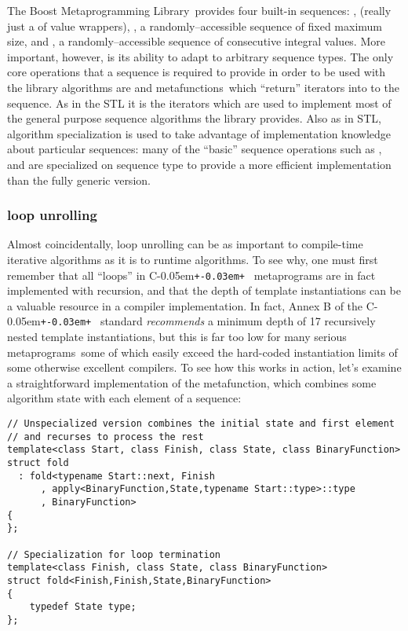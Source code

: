 \documentclass{kapproc}
\newcommand{\Cpp}{C\kern-0.05em\texttt{+\kern-0.03em+}%
}
\newcommand{\Mpl}{Boost Meta\-pro\-gram\-ming Library}
\newcommand{\mpgms}{meta\-pro\-grams}
\newcommand{\mfn}{meta\-func\-tion}
\newcommand{\mfns}{meta\-func\-tions}
\begin{document}
The \Mpl\ provides four built-in sequences: ,
 (really just a  of value
wrappers), , a randomly--accessible sequence of
fixed maximum size, and , a randomly--accessible
sequence of consecutive integral values. More important, however, is
its ability to adapt to arbitrary sequence types. The only core
operations that a sequence is required to provide in order to be used
with the library algorithms are  and  \mfns\
which ``return'' iterators into to the sequence. As in the STL it is
the iterators which are used to implement most of the general purpose
sequence algorithms the library provides. Also as in STL, algorithm
specialization is used to take advantage of implementation knowledge
about particular sequences: many of the ``basic'' sequence operations
such as \code{back<>}, \code{front<>} \code{size<>} and \code{at<>}
are specialized on sequence type to provide a more efficient
implementation than the fully generic version.


  \subsubsection{loop unrolling}

Almost coincidentally, loop unrolling can be as important to
compile-time iterative algorithms as it is to runtime algorithms. To
see why, one must first remember that all ``loops'' in \Cpp\
metaprograms are in fact implemented with recursion, and that the
depth of template instantiations can be a valuable resource in a
compiler implementation. In fact, Annex B of the \Cpp\ standard
\emph{recommends} a minimum depth of 17 recursively nested template
instantiations, but this is far too low for many serious \mpgms\ some
of which easily exceed the hard-coded instantiation limits of some
otherwise excellent compilers. To see how this works in action, let's
examine a straightforward implementation of the \code{fold} \mfn,
which combines some algorithm state with each element of a sequence:

{\small
\begin{codesamp}\begin{verbatim}
// Unspecialized version combines the initial state and first element
// and recurses to process the rest
template<class Start, class Finish, class State, class BinaryFunction>
struct fold
  : fold<typename Start::next, Finish
      , apply<BinaryFunction,State,typename Start::type>::type
      , BinaryFunction>
{
};

// Specialization for loop termination
template<class Finish, class State, class BinaryFunction>
struct fold<Finish,Finish,State,BinaryFunction>
{
    typedef State type;
};
\end{verbatim}
\end{codesamp}
}
\end{document}
